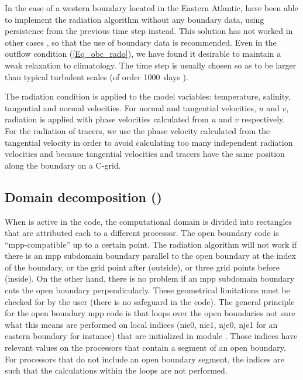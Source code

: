 In  the case of a western boundary located in the Eastern Atlantic, \citet{Penduff_al_JGR00} 
have been able to implement the radiation algorithm without any boundary data, 
using persistence from the previous time step instead. This solution has not worked 
in other cases \citep{Treguier_al_JGR01}, so that the use of boundary data is recommended. 
Even in the outflow condition (\ref{Eq_obc_rado}), we have found it desirable to 
maintain a weak relaxation to climatology. The time step is usually chosen so as to 
be larger than typical turbulent scales (of order 1000~days ).

The radiation condition is applied to the model variables: temperature, salinity, 
tangential and normal velocities. For normal and tangential velocities, $u$ and $v$, 
radiation is applied with phase velocities calculated from $u$ and $v$ respectively.  
For the radiation of tracers, we use the phase velocity calculated from the tangential 
velocity in order to avoid calculating too many independent radiation velocities and 
because tangential velocities and tracers have the same position along the boundary 
on a C-grid.  

\subsection{Domain decomposition ()}
\label{OBC_mpp}
When  is active in the code, the computational domain is divided 
into rectangles that are attributed each to a different processor. The open boundary 
code is ``mpp-compatible'' up to a certain point. The radiation algorithm will not 
work if there is an mpp subdomain boundary parallel to the open boundary at the 
index of the boundary, or the grid point after (outside), or three grid points before 
(inside). On the other hand, there is no problem if an mpp subdomain boundary 
cuts the open boundary perpendicularly. These geometrical limitations must be 
checked for by the user (there is no safeguard in the code).  
The general principle for the open boundary mpp code is that loops over the open 
boundaries {not sure what this means} are performed on local indices (nie0, 
nie1, nje0, nje1 for an eastern boundary for instance) that are initialized in module 
. Those indices have relevant values on the processors that contain 
a segment of an open boundary. For processors that do not include an open 
boundary segment, the indices are such that the calculations within the loops are 
not performed.
 
